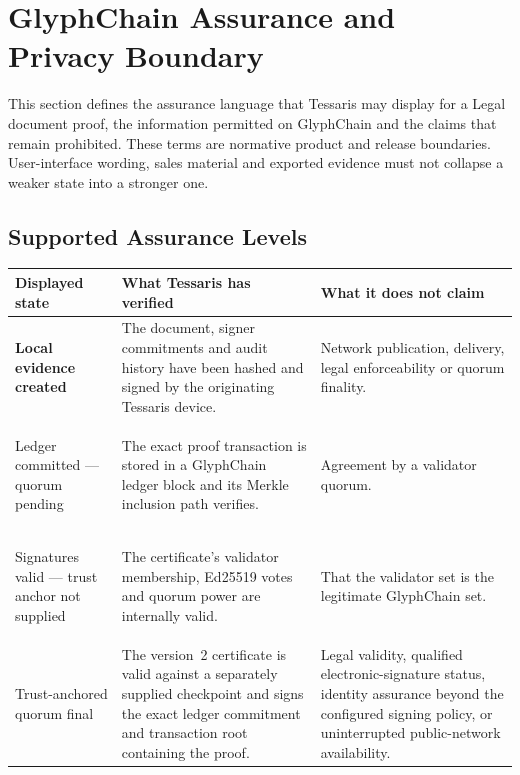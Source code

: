 
\section{GlyphChain Assurance and Privacy Boundary}
\label{sec:glyphchain-assurance-privacy-boundary}

This section defines the assurance language that Tessaris may display for a
Legal document proof, the information permitted on GlyphChain and the claims
that remain prohibited.  These terms are normative product and release
boundaries.  User-interface wording, sales material and exported evidence must
not collapse a weaker state into a stronger one.

\subsection{Supported Assurance Levels}

\begin{tabularx}{\textwidth}{@{}
  >{\raggedright\arraybackslash\bfseries}p{}
  >{\raggedright\arraybackslash}X
  >{\raggedright\arraybackslash}X@{}}
\toprule
Displayed state & What Tessaris has verified & What it does not claim \\
\midrule
Local evidence created &
The document, signer commitments and audit history have been hashed and signed
by the originating Tessaris device. &
Network publication, delivery, legal enforceability or quorum finality. \\
\addlinespace

Ledger committed --- quorum pending &
The exact proof transaction is stored in a GlyphChain ledger block and its
Merkle inclusion path verifies. &
Agreement by a validator quorum. \\
\addlinespace

Signatures valid --- trust anchor not supplied &
The certificate's validator membership, Ed25519 votes and quorum power are
internally valid. &
That the validator set is the legitimate GlyphChain set. \\
\addlinespace

Trust-anchored quorum final &
The version~2 certificate is valid against a separately supplied checkpoint and
signs the exact ledger commitment and transaction root containing the proof. &
Legal validity, qualified electronic-signature status, identity assurance
beyond the configured signing policy, or uninterrupted public-network
availability. \\
\bottomrule
\end{tabularx}

